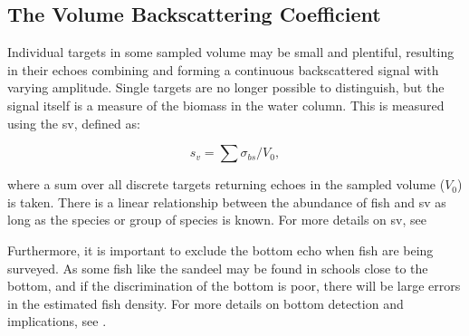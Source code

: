 \subsection{The Volume Backscattering Coefficient}
    Individual targets in some sampled volume may be small and plentiful, resulting in their echoes combining and forming a continuous backscattered signal with varying amplitude. Single targets are no longer possible to distinguish, but the signal itself is a measure of the biomass in the water column. This is measured using the \gls{sv}, defined as:
    
    \begin{equation}
        s_{v} = \sum \sigma_{bs} / V_{0},
    \end{equation}
    
    where a sum over all discrete targets returning echoes in the sampled volume ($V_{0}$) is taken. There is a linear relationship between the abundance of fish and \gls{sv} as long as the species or group of species is known. For more details on \gls{sv}, see \citet{simmonds2008fisheries}
    
    Furthermore, it is important to exclude the bottom echo when fish are being surveyed. As some fish like the sandeel may be found in schools close to the bottom, and if the discrimination of the bottom is poor, there will be large errors in the estimated fish density. For more details on bottom detection and implications, see \citet{simmonds2008fisheries}.
    
